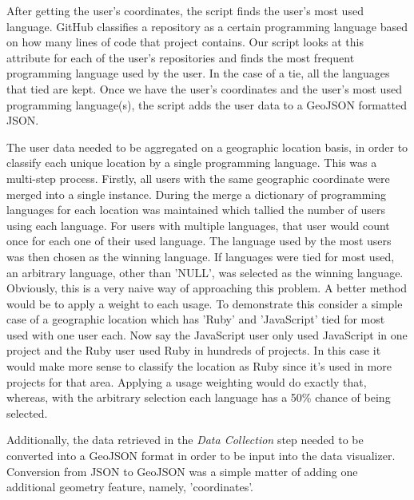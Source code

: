 \documentclass[11pt]{article}
\begin{document}
After getting the user’s coordinates, the script finds the user’s most used language. GitHub classifies a repository as a certain programming language based on how many lines of code that project contains. Our script looks at this attribute for each of the user’s repositories and finds the most frequent programming language used by the user. In the case of a tie, all the languages that tied are kept. Once we have the user’s coordinates and the user’s most used programming language(s), the script adds the user data to a GeoJSON formatted JSON.

The user data needed to be aggregated on a geographic location basis, in order to classify each unique location by a single programming language. This was a multi-step process. Firstly, all users with the same geographic coordinate were merged into a single instance. During the merge a dictionary of programming languages for each location was maintained which tallied the number of users using each language. For users with multiple languages, that user would count once for each one of their used language. The language used by the most users was then chosen as the winning language. If languages were tied for most used, an arbitrary language, other than 'NULL', was selected as the winning language. Obviously, this is a very naive way of approaching this problem. A better method would be to apply a weight to each usage. To demonstrate this consider a simple case of a geographic location which has 'Ruby' and 'JavaScript' tied for most used with one user each. Now say the JavaScript user only used JavaScript in one project and the Ruby user used Ruby in hundreds of projects. In this case it would make more sense to classify the location as Ruby since it's used in more projects for that area. Applying a usage weighting would do exactly that, whereas, with the arbitrary selection each language has a 50\% chance of being selected.

Additionally, the data retrieved in the \textit{Data Collection} step needed to be converted into a GeoJSON format in order to be input into the data visualizer. Conversion from JSON to GeoJSON was a simple matter of adding one additional geometry feature, namely, 'coordinates'.
\end{document}
